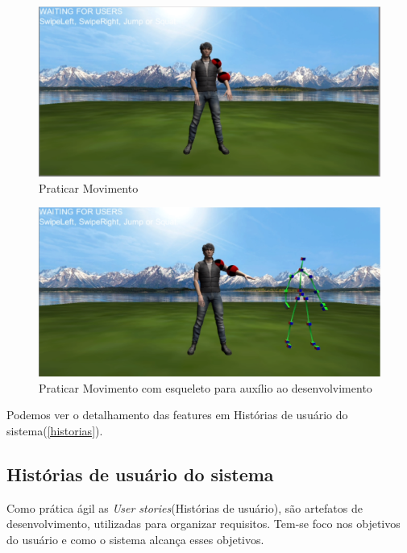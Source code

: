      \begin{figure}[H]
     \centering
     \includegraphics [keepaspectratio=true,scale=0.40]{figuras/praticarmovimento.eps}
     \caption{Praticar Movimento}
     \label{img:praticarMovimento}
     \end{figure}

     \begin{figure}[H]
     \centering
     \includegraphics [keepaspectratio=true,scale=0.40]{figuras/praticarmovimento2.eps}
     \caption{Praticar Movimento com esqueleto para auxílio ao desenvolvimento}
     \label{img2:praticarMovimento}
     \end{figure}


   Podemos ver o detalhamento das features em Histórias de usuário do sistema(\ref{historias}).
 \subsection{Histórias de usuário do sistema}
 \label{sec:Histórias de usuário}
   Como prática ágil as \textit{User stories}(Histórias de usuário), são artefatos
 de desenvolvimento, utilizadas para organizar requisitos. Tem-se foco nos objetivos
 do usuário e como o sistema alcança esses objetivos.

